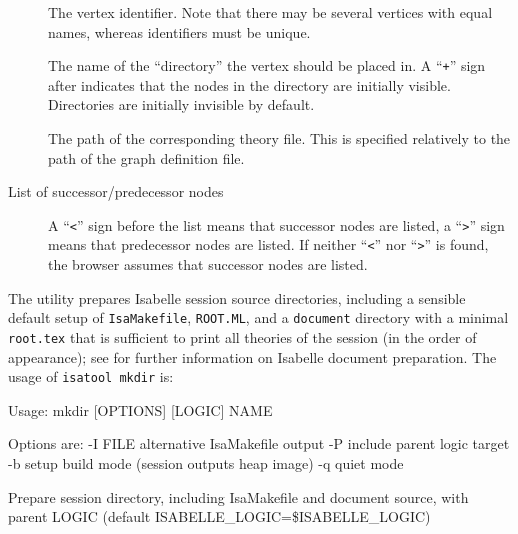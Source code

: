 \begin{isabellebody}
\begin{isamarkuptext}
\begin{description}
  \item[] The vertex identifier. Note that there may
  be several vertices with equal names, whereas identifiers must be
  unique.
  
  \item[] The name of the ``directory'' the vertex
  should be placed in.  A ``\verb|+|'' sign after  indicates that the nodes in the directory are initially
  visible. Directories are initially invisible by default.
  
  \item[] The path of the corresponding theory file. This
  is specified relatively to the path of the graph definition file.
  
  \item[List of successor/predecessor nodes] A ``\verb|<|''
  sign before the list means that successor nodes are listed, a
  ``\verb|>|'' sign means that predecessor nodes are listed. If
  neither ``\verb|<|'' nor ``\verb|>|'' is found, the
  browser assumes that successor nodes are listed.

  \end{description}%
\end{isamarkuptext}%
\isamarkuptrue%
%
\isamarkuptrue%
%
\begin{isamarkuptext}%
The \hypertarget{tool.mkdir}{\hyperlink{tool.mkdir}{\mbox{}}} utility prepares Isabelle session source
  directories, including a sensible default setup of \verb|IsaMakefile|, \verb|ROOT.ML|, and a \verb|document|
  directory with a minimal \verb|root.tex| that is sufficient to
  print all theories of the session (in the order of appearance); see
   for further information on Isabelle
  document preparation.  The usage of \verb|isatool mkdir| is:

\begin{ttbox}
Usage: mkdir [OPTIONS] [LOGIC] NAME

  Options are:
    -I FILE      alternative IsaMakefile output
    -P           include parent logic target
    -b           setup build mode (session outputs heap image)
    -q           quiet mode

  Prepare session directory, including IsaMakefile and document source,
  with parent LOGIC (default ISABELLE_LOGIC=\$ISABELLE_LOGIC)
\end{ttbox}


\end{isamarkuptext}
\end{isabellebody}
